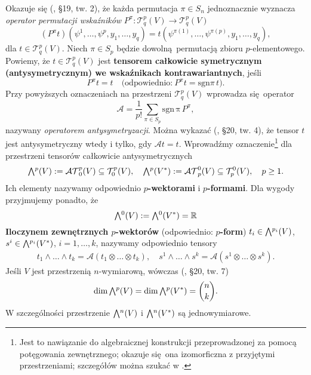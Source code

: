 Okazuje się (\cite{herdegen}, §19, tw. 2), że każda permutacja \(\pi\in S_n\) jednoznacznie wyznacza \emph{operator permutacji wskaźników} \(P^{\pi}:\mathcal{T}_q^p(V)\to\mathcal{T}_q^p(V)\)
\begin{equation*}
    (P^\pi t)(\psi^1, \dots, \psi^p, y_1, \dots, y_q) = t(\psi^{\pi(1)}, \dots, \psi^{\pi(p)}, y_1, \dots, y_q),
\end{equation*} dla \(t\in\mathcal{T}_q^p(V)\). Niech \(\pi\in S_p\) będzie dowolną permutacją zbioru \(p\)-elementowego. Powiemy, że \(t\in\mathcal{T}_q^p(V)\) jest \textbf{tensorem całkowicie symetrycznym (antysymetrycznym) we wskaźnikach kontrawariantnych}, jeśli 
\begin{equation*}
    P^\pi t = t\quad \text{(odpowiednio:}\ P^\pi t = \mathrm{sgn}\pi\, t\text{)}. 
\end{equation*}
Przy powyższych oznaczeniach na przestrzeni \(\mathcal{T}_q^p(V)\) wprowadza się operator
\begin{equation*}
    \mathcal{A}=\frac{1}{p!}\sum_{\pi\in S_p} \mathrm{sgn\,\pi}\,P^\pi,
\end{equation*}
nazywany \emph{operatorem antysymetryzacji}. Można wykazać (\cite{herdegen}, §20, tw. 4), że tensor \(t\) jest antysymetryczny wtedy i tylko, gdy \(\mathcal{A}t = t\). Wprowadźmy oznaczenie\footnote{Jest to nawiązanie do algebraicznej konstrukcji przeprowadzonej za pomocą potęgowania zewnętrznego; okazuje się ona izomorficzna z przyjętymi przestrzeniami; szczegółów można szukać w \cite{maurin2}.} dla przestrzeni tensorów całkowicie antysymetrycznych
\begin{align*}
    \Exterior^p(V):=\mathcal{AT}^p_0(V)\subseteq \mathcal{T}^p_0(V),\quad \Exterior^p(V^\ast):=\mathcal{AT}^0_p(V)\subseteq\mathcal{T}^0_p(V), \quad p\geq 1.
\end{align*}
Ich elementy nazywamy odpowiednio \textbf{\(p\)-wektorami} i \textbf{\(p\)-formami}. Dla wygody przyjmujemy ponadto, że
\begin{equation*}
     \Exterior^0(V):=\Exterior^0(V^\ast)=\R
\end{equation*}
\textbf{Iloczynem zewnętrznych \(p\)-wektorów} (odpowiednio: \textbf{\(p\)-form}) \(t_i\in\Exterior^{p_i}(V)\), \(s^i\in\Exterior^{p_i}(V^\ast)\), \(i=1,\dots, k\), nazywamy odpowiednio tensory
\begin{align*}
    t_1\wedge\dots\wedge t_k = \mathcal{A}(t_1\otimes \dots \otimes t_k), \quad 
    s^1\wedge\dots\wedge s^k = \mathcal{A}(s^1\otimes \dots \otimes s^k).
\end{align*}
Jeśli \(V\) jest przestrzenią \(n\)-wymiarową, wówczas (\cite{herdegen}, §20, tw. 7)
\begin{equation*}
    \mathrm{dim}\,\Exterior^p(V) = \mathrm{dim}\,\Exterior^p(V^\ast) = \binom{n}{k}.
\end{equation*}
W szczególności przestrzenie \(\Exterior^n(V)\) i \(\Exterior^n(V^\ast)\) są jednowymiarowe. 

